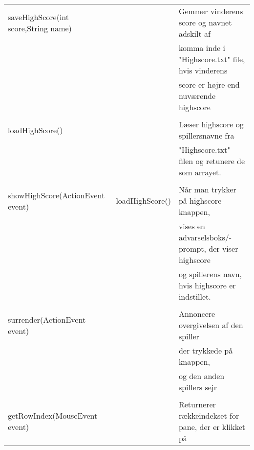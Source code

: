 \begin{table}[H]
\begin{tabular}{lll}
        saveHighScore(int score,String name) &                 & Gemmer vinderens score og navnet adskilt af               \\
                                             &                 & komma inde i "Highscore.txt" file, hvis vinderens         \\
                                             &                 & score er højre end nuværende highscore                    \\
                                             &                 &                                                           \\
        loadHighScore()                      &                 & Læser highscore og spillersnavne fra                      \\
                                             &                 & "Highscore.txt" filen og retunere de som arrayet.         \\
                                             &                 &                                                           \\
        showHighScore(ActionEvent event)     & loadHighScore() & Når man trykker på highscore-knappen,                     \\
                                             &                 & vises en advarselsboks/-prompt, der viser highscore       \\
                                             &                 & og spillerens navn, hvis highscore er indstillet.         \\
                                             &                 &                                                           \\
        surrender(ActionEvent event)         &                 & Annoncere overgivelsen af den spiller                     \\
                                             &                 & der trykkede på knappen,                                  \\
                                             &                 & og den anden spillers sejr                                \\
                                             &                 &                                                           \\
        getRowIndex(MouseEvent event)        &                 & Returnerer rækkeindekset for pane, der er klikket på      \\

\end{tabular}
\end{table}
